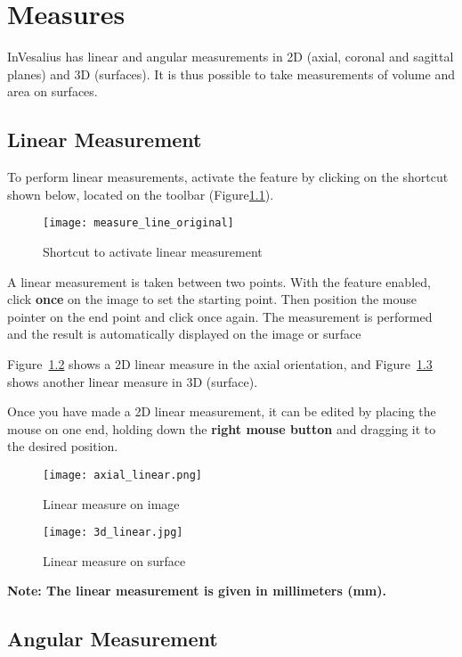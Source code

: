 \chapter{Measures}

InVesalius has linear and angular measurements in 2D (axial, coronal and sagittal planes) and 3D (surfaces). It is thus possible to take measurements of volume and area on surfaces.

\section{Linear Measurement}

To perform linear measurements, activate the feature by clicking on the shortcut shown below, located on the toolbar (Figure\ref{fig:measure_line_original}).

\begin{figure}[!htb]
\centering
\texttt{[image: measure\_line\_original]}
\caption{Shortcut to activate linear measurement}
\label{fig:measure_line_original}
\end{figure}

A linear measurement is taken between two points. With the feature enabled, click \textbf{once} on the image to set the starting point. Then position the mouse pointer on the end point and click once again. The measurement is performed and the result is automatically displayed on the image or surface

Figure~\ref{fig:axial_linear} shows a 2D linear measure in the axial orientation, and Figure~\ref{fig:3d_linear} shows another linear measure in 3D (surface).

Once you have made a 2D linear measurement, it can be edited by placing the mouse on one end, holding down the \textbf{right mouse button} and dragging it to the desired position.

\begin{figure}[!htb]
\centering
\texttt{[image: axial\_linear.png]}
\caption{Linear measure on image}
\label{fig:axial_linear}
\end{figure}

\begin{figure}[!htb]
\centering
\texttt{[image: 3d\_linear.jpg]}
\caption{Linear measure on surface}
\label{fig:3d_linear}
\end{figure}

\textbf{Note: The linear measurement is given in millimeters (mm).}

\section{Angular Measurement}

